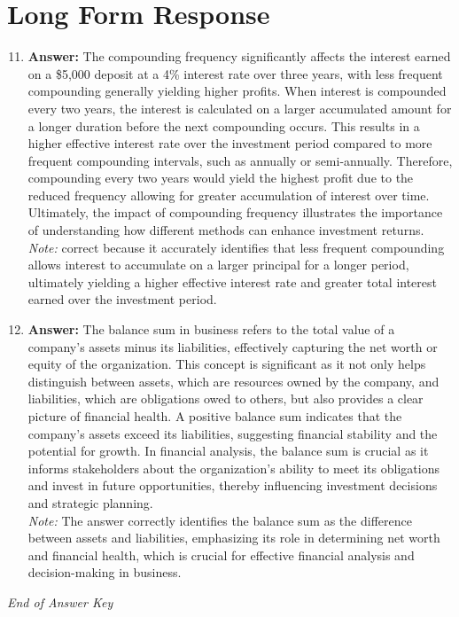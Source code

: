 \documentclass[12pt]{article}
\begin{document}
\section*{Long Form Response}
\begin{enumerate}[label=\arabic*.]
\setcounter{enumi}{10}
\item \textbf{Answer:} The compounding frequency significantly affects the interest earned on a \$5,000 deposit at a 4\% interest rate over three years, with less frequent compounding generally yielding higher profits. When interest is compounded every two years, the interest is calculated on a larger accumulated amount for a longer duration before the next compounding occurs. This results in a higher effective interest rate over the investment period compared to more frequent compounding intervals, such as annually or semi-annually. Therefore, compounding every two years would yield the highest profit due to the reduced frequency allowing for greater accumulation of interest over time. Ultimately, the impact of compounding frequency illustrates the importance of understanding how different methods can enhance investment returns.
\\ \textit{Note:} correct because it accurately identifies that less frequent compounding allows interest to accumulate on a larger principal for a longer period, ultimately yielding a higher effective interest rate and greater total interest earned over the investment period.
\item \textbf{Answer:} The balance sum in business refers to the total value of a company's assets minus its liabilities, effectively capturing the net worth or equity of the organization. This concept is significant as it not only helps distinguish between assets, which are resources owned by the company, and liabilities, which are obligations owed to others, but also provides a clear picture of financial health. A positive balance sum indicates that the company's assets exceed its liabilities, suggesting financial stability and the potential for growth. In financial analysis, the balance sum is crucial as it informs stakeholders about the organization's ability to meet its obligations and invest in future opportunities, thereby influencing investment decisions and strategic planning.
\\ \textit{Note:} The answer correctly identifies the balance sum as the difference between assets and liabilities, emphasizing its role in determining net worth and financial health, which is crucial for effective financial analysis and decision-making in business.
\end{enumerate}

\vfill
\noindent\textit{End of Answer Key}
\end{document}
